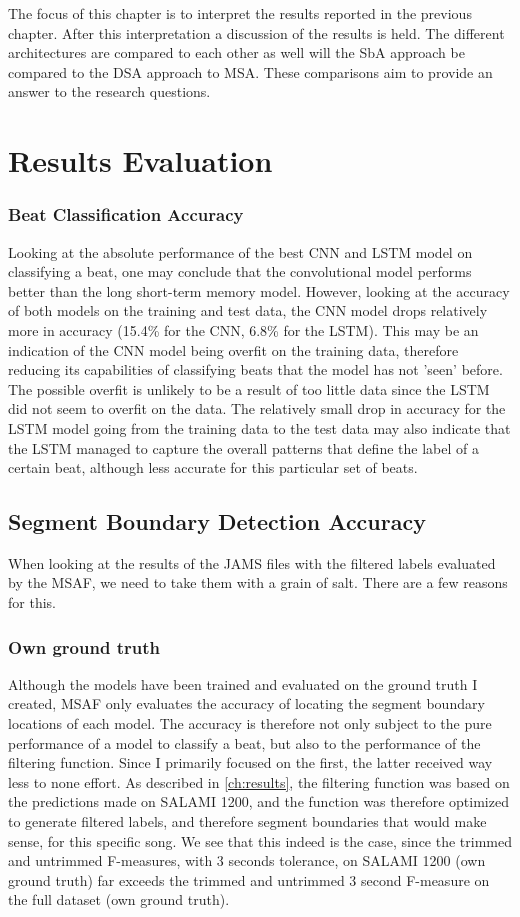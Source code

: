 The focus of this chapter is to interpret the results reported in the previous chapter. After this interpretation a discussion of the results is held. The different architectures are compared to each other as well will the SbA approach be compared to the DSA approach to MSA. These comparisons aim to provide an answer to the research questions.


\section{Results Evaluation}
\subsubsection{Beat Classification Accuracy}
Looking at the absolute performance of the best CNN and LSTM model on classifying a beat, one may conclude that the convolutional model performs better than the long short-term memory model. However, looking at the accuracy of both models on the training and test data, the CNN model drops relatively more in accuracy (15.4\% for the CNN, 6.8\% for the LSTM). This may be an indication of the CNN model being overfit on the training data, therefore reducing its capabilities of classifying beats that the model has not 'seen' before. The possible overfit is unlikely to be a result of too little data since the LSTM did not seem to overfit on the data. The relatively small drop in accuracy for the LSTM model going from the training data to the test data may also indicate that the LSTM managed to capture the overall patterns that define the label of a certain beat, although less accurate for this particular set of beats.

\subsection{Segment Boundary Detection Accuracy}
When looking at the results of the JAMS files with the filtered labels evaluated by the MSAF, we need to take them with a grain of salt. There are a few reasons for this.

\subsubsection{Own ground truth}
Although the models have been trained and evaluated on the ground truth I created, MSAF only evaluates the accuracy of locating the segment boundary locations of each model. The accuracy is therefore not only subject to the pure performance of a model to classify a beat, but also to the performance of the filtering function. Since I primarily focused on the first, the latter received way less to none effort. As described in \autoref{ch:results}, the filtering function was based on the predictions made on SALAMI 1200, and the function was therefore optimized to generate filtered labels, and therefore segment boundaries that would make sense, for this specific song. We see that this indeed is the case, since the trimmed and untrimmed F-measures, with 3 seconds tolerance, on SALAMI 1200 (own ground truth) far exceeds the trimmed and untrimmed 3 second F-measure on the full dataset (own ground truth).

